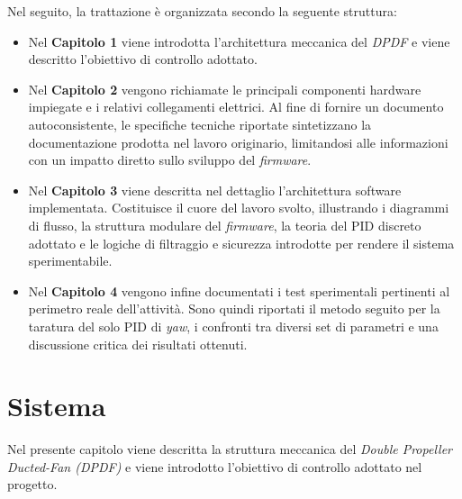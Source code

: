 \documentclass[11pt]{report}
\begin{document}
Nel seguito, la trattazione è organizzata secondo la seguente struttura:
\begin{itemize}
    \item Nel \textbf{Capitolo 1} viene introdotta l'architettura meccanica del \textit{DPDF} e viene descritto l'obiettivo di controllo adottato.
    \item Nel \textbf{Capitolo 2} vengono richiamate le principali componenti hardware impiegate e i relativi collegamenti elettrici. Al fine di fornire un documento autoconsistente, le specifiche tecniche riportate sintetizzano la documentazione prodotta nel lavoro originario, limitandosi alle informazioni con un impatto diretto sullo sviluppo del \textit{firmware}.
    \item Nel \textbf{Capitolo 3} viene descritta nel dettaglio l'architettura software implementata. Costituisce il cuore del lavoro svolto, illustrando i diagrammi di flusso, la struttura modulare del \textit{firmware}, la teoria del PID discreto adottato e le logiche di filtraggio e sicurezza introdotte per rendere il sistema sperimentabile.
    \item Nel \textbf{Capitolo 4} vengono infine documentati i test sperimentali pertinenti al perimetro reale dell'attività. Sono quindi riportati il metodo seguito per la taratura del solo PID di \textit{yaw}, i confronti tra diversi set di parametri e una discussione critica dei risultati ottenuti.
\end{itemize}
	\newpage
	\chapter{Sistema}
	Nel presente capitolo viene descritta la struttura meccanica del \textit{Double Propeller Ducted-Fan (DPDF)} e viene introdotto l'obiettivo di controllo adottato nel progetto.
	
\end{document}
